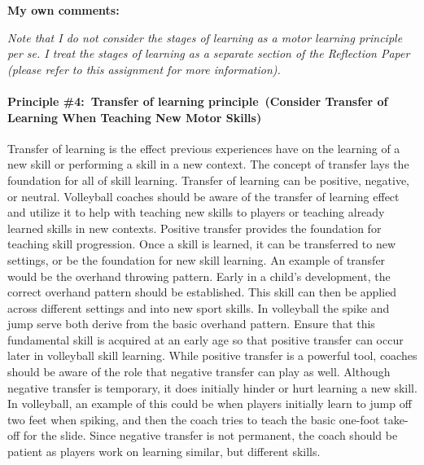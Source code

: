 \documentclass[
  letterpaper,
  DIV=11,
  numbers=noendperiod]{scrartcl}
\let\oldparagraph\paragraph
\renewcommand{\paragraph}[1]{\oldparagraph{#1}\mbox{}}
\begin{document}
\textbf{My own comments:}

\emph{Note that I do not consider the stages of learning as a motor
learning principle per se. I treat the stages of learning as a separate
section of the Reflection Paper (please refer to this assignment for
more information).}

\hypertarget{principle-4-transfer-of-learning-principle-consider-transfer-of-learning-when-teaching-new-motor-skills}{%
\paragraph{\texorpdfstring{\textbf{Principle \#4:~Transfer of learning
principle~(Consider Transfer of Learning When Teaching New Motor
Skills)}}{Principle \#4:~Transfer of learning principle~(Consider Transfer of Learning When Teaching New Motor Skills)}}\label{principle-4-transfer-of-learning-principle-consider-transfer-of-learning-when-teaching-new-motor-skills}}

Transfer of learning is the effect previous experiences have on the
learning of a new skill or performing a skill in a new context. The
concept of transfer lays the foundation for all of skill learning.
Transfer of learning can be positive, negative, or neutral. Volleyball
coaches should be aware of the transfer of learning effect and utilize
it to help with teaching new skills to players or teaching already
learned skills in new contexts. Positive transfer provides the
foundation for teaching skill progression. Once a skill is learned, it
can be transferred to new settings, or be the foundation for new skill
learning. An example of transfer would be the overhand throwing pattern.
Early in a child's development, the correct overhand pattern should be
established. This skill can then be applied across different settings
and into new sport skills. In volleyball the spike and jump serve both
derive from the basic overhand pattern. Ensure that this fundamental
skill is acquired at an early age so that positive transfer can occur
later in volleyball skill learning. While positive transfer is a
powerful tool, coaches should be aware of the role that negative
transfer can play as well. Although negative transfer is temporary, it
does initially hinder or hurt learning a new skill. In volleyball, an
example of this could be when players initially learn to jump off two
feet when spiking, and then the coach tries to teach the basic one-foot
take-off for the slide. Since negative transfer is not permanent, the
coach should be patient as players work on learning similar, but
different skills.
\end{document}
